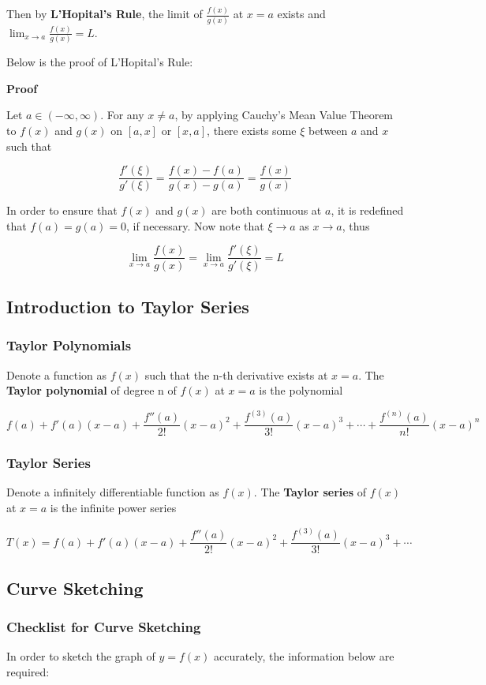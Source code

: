 \documentclass[a4paper,12pt]{article}
\newcommand{\s}{\vspace{1mm}}
\newcommand{\n}{\vspace{3mm}}
\newenvironment{block}[4][Block]{ %
\begin{list}{}{
  \setlength{\leftmargin}{0mm}
  \setlength{\rightmargin}{0mm}
  \setlength{\topsep}{0mm}
  \setlength{\partopsep}{0mm}
  \parsep\parskip
  \setlength{\itemsep}{-\parsep}
  }
  \needspace{\baselineskip}
  \item \textbf{#2 #3} \hspace{1mm} #4
  \vspace{1mm}
  \item
  }
{
\end{list}
}
\begin{document}
Then by \textbf{L'Hopital's Rule}, the limit of $\frac{f(x)}{g(x)}$ at $x=a$ exists and $\lim_{x\to a}\frac{f(x)}{g(x)}=L$.\n

Below is the proof of L'Hopital's Rule:\n

\begin{block}{Proof}{}{}
  Let $a\in (-\infty,\infty)$. For any $x\neq a$, by applying Cauchy's Mean Value Theorem to $f(x)$ and $g(x)$ on $[a,x]$ or $[x,a]$, there exists some $\xi$ between $a$ and $x$ such that

  $$\frac{f'(\xi)}{g'(\xi)}=\frac{f(x)-f(a)}{g(x)-g(a)}=\frac{f(x)}{g(x)}$$\s

  In order to ensure that $f(x)$ and $g(x)$ are both continuous at $a$, it is redefined that $f(a)=g(a)=0$, if necessary. Now note that $\xi\to a$ as $x\to a$, thus

  $$\lim_{x\to a}\frac{f(x)}{g(x)}=\lim_{x\to a}\frac{f'(\xi)}{g'(\xi)}=L$$
\end{block}

\subsection{Introduction to Taylor Series}
\subsubsection{Taylor Polynomials}
Denote a function as $f(x)$ such that the n-th derivative exists at $x=a$. The \textbf{Taylor polynomial} of degree n of $f(x)$ at $x=a$ is the polynomial

$$f(a)+f'(a)(x-a)+\frac{f''(a)}{2!}(x-a)^{2}+\frac{f^{(3)}(a)}{3!}(x-a)^{3}+\cdots+\frac{f^{(n)}(a)}{n!}(x-a)^{n}$$

\subsubsection{Taylor Series}
Denote a infinitely differentiable function as $f(x)$. The \textbf{Taylor series} of $f(x)$ at $x=a$ is the infinite power series

$$T(x)=f(a)+f'(a)(x-a)+\frac{f''(a)}{2!}(x-a)^{2}+\frac{f^{(3)}(a)}{3!}(x-a)^{3}+\cdots$$

\subsection{Curve Sketching}
\subsubsection{Checklist for Curve Sketching}
In order to sketch the graph of $y=f(x)$ accurately, the information below are required:
\end{document}
